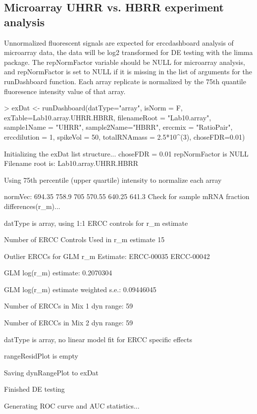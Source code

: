 \documentclass{article}
\begin{document}
\clearpage
\subsection{Microarray UHRR vs. HBRR experiment analysis}
Unnormalized fluorescent signals are expected for erccdashboard analysis of 
microarray data, the data will be log2 transformed for DE testing with the limma
package. The repNormFactor variable should
be NULL for microarray analysis, and repNormFactor is set to NULL if it is 
missing in the list of arguments for the runDashboard function. Each array 
replicate is normalized by the 75th quantile fluoresence intensity 
value of that array.
\begin{Schunk}
\begin{Sinput}
> exDat <- runDashboard(datType="array", isNorm = F,
                        exTable=Lab10.array.UHRR.HBRR,
                        filenameRoot = "Lab10.array",
                        sample1Name = "UHRR", sample2Name="HBRR",
                        erccmix = "RatioPair", erccdilution = 1, 
                        spikeVol = 50, totalRNAmass = 2.5*10^(3), choseFDR=0.01)
\end{Sinput}
\begin{Soutput}
Initializing the exDat list structure...
choseFDR = 0.01 
repNormFactor is NULL 
Filename root is: Lab10.array.UHRR.HBRR 

Using 75th percentile (upper quartile) intensity to normalize each array

normVec:
694.35 758.9 705 570.55 640.25 641.3
Check for sample mRNA fraction differences(r_m)...

datType is array, using 1:1 ERCC controls for r_m estimate

Number of ERCC Controls Used in r_m estimate
15 

Outlier ERCCs for GLM r_m Estimate:
ERCC-00035 ERCC-00042

GLM log(r_m) estimate:
0.2070304 

GLM log(r_m) estimate weighted s.e.:
0.09446045 

Number of ERCCs in Mix 1 dyn range:  59 

Number of ERCCs in Mix 2 dyn range:  59 

datType is array, no linear model fit for ERCC specific effects

rangeResidPlot is empty

Saving dynRangePlot to exDat

Finished DE testing

Generating ROC curve and AUC statistics...


\end{Soutput}
\end{Schunk}
\end{document}

